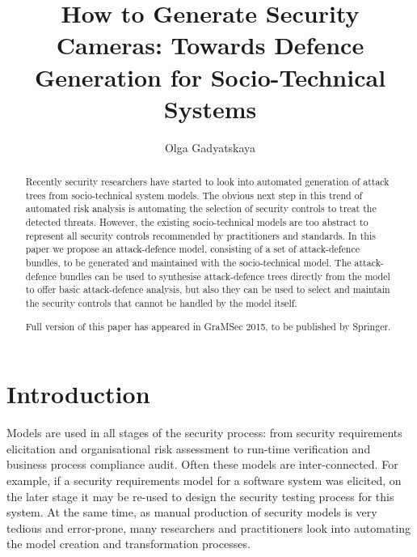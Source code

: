 \documentclass{llncs}
\begin{document}
\title{How to Generate Security Cameras: Towards Defence Generation for Socio-Technical Systems}

\author{Olga Gadyatskaya}






\maketitle              




\begin{abstract}
Recently security researchers have started to look into automated generation of attack trees from socio-technical system models. The obvious next step in this trend of automated risk analysis is automating the selection of security controls to treat the detected threats. However, the existing socio-technical models are too abstract to represent all security controls recommended by practitioners and standards. In this paper we propose an attack-defence model, consisting of a set of attack-defence bundles, to be generated and maintained with the socio-technical model. The attack-defence bundles can be used to synthesise attack-defence trees directly from the model to offer basic attack-defence analysis, but also they can be used to select and maintain the security controls that cannot be handled by the model itself.

Full version of this paper has appeared in GraMSec 2015, to be published by Springer.

\end{abstract}


\section{Introduction}\label{sec:introduction}

Models are used in all stages of the security process: from security requirements elicitation and organisational risk assessment to run-time verification and business process compliance audit. Often these models are inter-connected. For example, if a security requirements model for a software system was elicited, on the later stage it may be re-used to design the security testing process for this system. At the same time, as manual production of security models is very tedious and error-prone, many researchers and practitioners look into automating the model creation and transformation processes.
\end{document}
